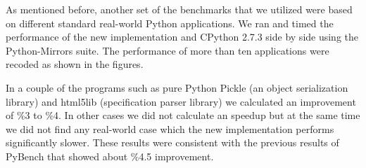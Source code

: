 \documentclass[12pt]{article}
\begin{document}
As mentioned before, another set of the benchmarks that we utilized were based on different standard real-world Python applications. We ran and timed the performance of the new implementation and CPython 2.7.3 side by side using the Python-Mirrors suite. The performance of more than ten applications were recoded as shown in the figures.




In a couple of the programs such as pure Python Pickle (an object serialization library) and html5lib (specification parser library) we calculated an improvement of \%3 to \%4. In other cases we did not calculate an speedup but at the same time we did not find any real-world case which the new implementation performs significantly slower. These results were consistent with the previous results of PyBench that showed about \%4.5 improvement.
 
\end{document}
